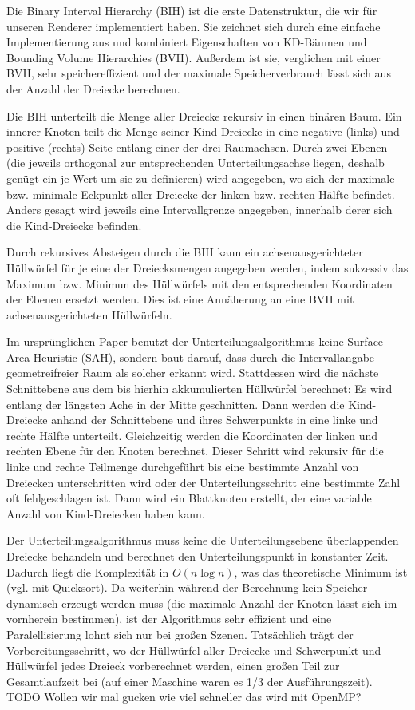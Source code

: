 Die Binary Interval Hierarchy (BIH) ist die erste Datenstruktur, die wir für unseren Renderer implementiert haben. Sie zeichnet sich durch eine einfache Implementierung aus und kombiniert Eigenschaften von KD-Bäumen und Bounding Volume Hierarchies (BVH). Außerdem ist sie, verglichen mit einer BVH, sehr speichereffizient und der maximale Speicherverbrauch lässt sich aus der Anzahl der Dreiecke berechnen.

Die BIH unterteilt die Menge aller Dreiecke rekursiv in einen binären Baum. Ein innerer Knoten teilt die Menge seiner Kind-Dreiecke in eine negative (links) und positive (rechts) Seite entlang einer der drei Raumachsen. Durch zwei Ebenen (die jeweils orthogonal zur entsprechenden Unterteilungsachse liegen, deshalb genügt ein je  Wert um sie zu definieren) wird angegeben, wo sich der maximale bzw. minimale Eckpunkt aller Dreiecke der linken bzw. rechten Hälfte befindet. Anders gesagt wird jeweils eine Intervallgrenze angegeben, innerhalb derer sich die Kind-Dreiecke befinden.

Durch rekursives Absteigen durch die BIH kann ein achsenausgerichteter Hüllwürfel für je eine der Dreiecksmengen angegeben werden, indem sukzessiv das Maximum bzw. Minimun des Hüllwürfels mit den entsprechenden Koordinaten der Ebenen ersetzt werden. Dies ist eine Annäherung an eine BVH mit achsenausgerichteten Hüllwürfeln.

Im ursprünglichen Paper benutzt der Unterteilungsalgorithmus keine Surface Area Heuristic (SAH), sondern baut darauf, dass durch die Intervallangabe geometreifreier Raum als solcher erkannt wird. Stattdessen wird die nächste Schnittebene aus dem bis hierhin akkumulierten Hüllwürfel berechnet: Es wird entlang der längsten Ache in der Mitte geschnitten. Dann werden die Kind-Dreiecke anhand der Schnittebene und ihres Schwerpunkts in eine linke und rechte Hälfte unterteilt. Gleichzeitig werden die Koordinaten der linken und rechten Ebene für den Knoten berechnet. Dieser Schritt wird rekursiv für die linke und rechte Teilmenge durchgeführt bis eine bestimmte Anzahl von Dreiecken unterschritten wird oder der Unterteilungsschritt eine bestimmte Zahl oft fehlgeschlagen ist. Dann wird ein Blattknoten erstellt, der eine variable Anzahl von Kind-Dreiecken haben kann.

Der Unterteilungsalgorithmus muss keine die Unterteilungsebene überlappenden Dreiecke behandeln und berechnet den Unterteilungspunkt in konstanter Zeit. Dadurch liegt die Komplexität in $O(n \log n)$, was das theoretische Minimum ist (vgl. mit Quicksort). Da weiterhin während der Berechnung kein Speicher dynamisch erzeugt werden muss (die maximale Anzahl der Knoten lässt sich im vornherein bestimmen), ist der Algorithmus sehr effizient und eine Paralellisierung lohnt sich nur bei großen Szenen. Tatsächlich trägt der Vorbereitungsschritt, wo der Hüllwürfel aller Dreiecke und Schwerpunkt und Hüllwürfel jedes Dreieck vorberechnet werden, einen großen Teil zur Gesamtlaufzeit bei (auf einer Maschine waren es 1/3 der Ausführungszeit). TODO Wollen wir mal gucken wie viel schneller das wird mit OpenMP?

